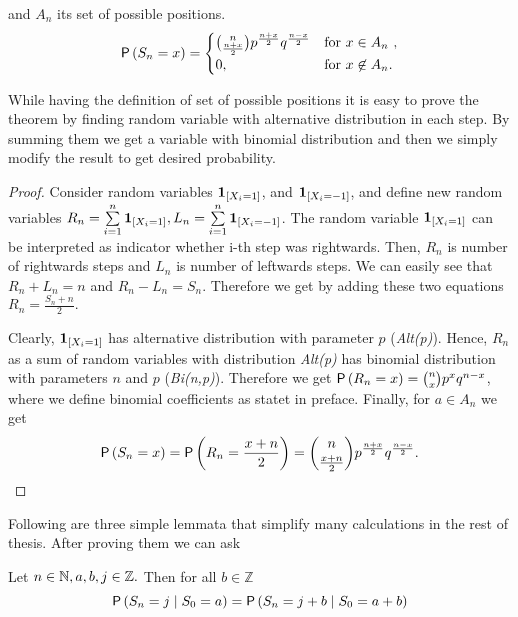 \begin{thm}\label{thm-probability_position_time}
 \Lrw and $A_n$ its set of possible positions.
 \[
 \operatorname{\mathsf{P}} \left( S_n=x \right) =
 \begin{cases}
 \binom{n}{\frac{n+x}{2}}p^{\frac{n+x}{2}}q^{\frac{n-x}{2}} & \text{for $x \in A_n$ },\\
 0, & \text{for $x \not\in A_n$}.
 \end{cases}
 \]

\end{thm}

\begin{rem}
  While having the definition of set of possible positions it is easy to prove the theorem by finding random variable with alternative distribution in each step. By summing them we get a variable with binomial distribution and then we simply modify the result to get desired probability.
\end{rem}

\begin{proof}
  Consider random variables $\mathbf{1}_{[X_i=1]}$, and
   $\mathbf{1}_{[X_i=-1]}$, and define new random variables
   $R_n=\suma \indikator{X_i=1}, L_n=\suma \indikator{X_i=-1}$.  The
   random variable $\mathbf{1}_{[X_i=1]}$ can be interpreted as indicator
   whether i-th step was rightwards. Then, $R_n$ is number of
   rightwards steps and $L_n$ is number of leftwards steps. We can
   easily see that $R_n+L_n=n$ and $R_n-L_n=S_n$.  Therefore we get by
   adding these two equations $R_n=\frac{S_n+n}{2}.$

   Clearly, $\mathbf{1}_{[X_i=1]}$ has alternative distribution with
   parameter $p$ (\textit{Alt(p)}). Hence, $R_n$ as a sum of \iid
   random variables with distribution \textit{Alt(p)} has binomial
   distribution with parameters $n$ and $p$ (\textit{Bi(n,p)}).
   Therefore we get
   $\operatorname{\mathsf{P}} \left(R_n=x \right) =\binom{n}{x}p^{x}q^{n-x}$, where we define
  binomial coefficients as statet in preface.
   Finally, for $a \in A_n$ we get
   \[
     \operatorname{\mathsf{P}} \left( S_n=x \right) =\operatorname{\mathsf{P}}\left( R_n=\frac{x+n}{2} \right) =
     \binom{n}{\frac{x+n}{2}}p^{\frac{n+x}{2}}q^{\frac{n-x}{2}}.
   \]
\end{proof}

\begin{rem}
  Following are three simple lemmata that simplify many calculations in the rest of thesis. After proving them we can ask
\end{rem}

\begin{lemma}\label{lemma-spatial_homogeneity}
  Let $n \in \mathbb{N}, a,b,j \in \mathbb{Z}.$ Then for all $b \in \mathbb Z$
\[
  \operatorname{\mathsf{P}} \left( S_n=j \mid S_0=a \right) =\operatorname{\mathsf{P}} \left( S_n=j+b \mid
    S_0=a+b \right)
\]
\end{lemma}

